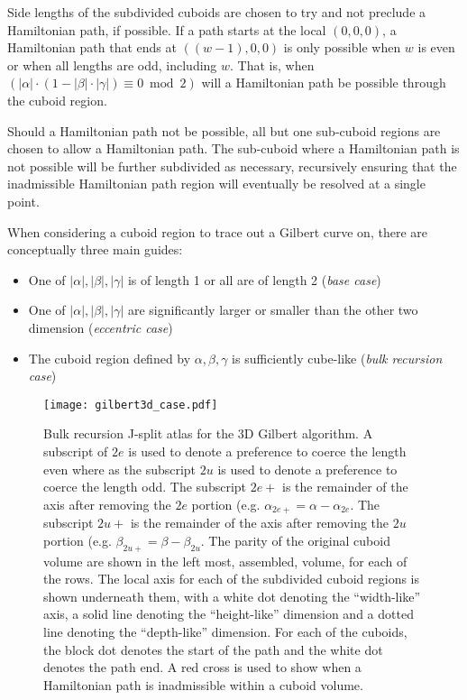 Side lengths of the subdivided cuboids are chosen to try and not preclude a
Hamiltonian path, if possible.
If a path starts at the local $(0,0,0)$, a Hamiltonian path that ends
at $((w-1),0,0)$ is only possible when $w$ is even or when all lengths are odd, including $w$.
That is, when $(|\alpha| \cdot ( 1 - |\beta| \cdot |\gamma| ) \equiv 0 \bmod 2)$ will a Hamiltonian
path be possible through the cuboid region.

Should a Hamiltonian path not be possible, all but one sub-cuboid regions are chosen to allow a Hamiltonian
path.
The sub-cuboid where a Hamiltonian path is not possible will be further subdivided as necessary, recursively
ensuring that the inadmissible Hamiltonian path region will eventually be resolved at a single point.

When considering a cuboid region to trace out a Gilbert curve on, there are conceptually three main guides:

\begin{itemize}
  \item One of $|\alpha|, |\beta|, |\gamma|$ is of length 1 or all are of length 2 (\textit{base case})
  \item One of $|\alpha|, |\beta|, |\gamma|$ are significantly larger or smaller than the other two dimension (\textit{eccentric case})
  \item The cuboid region defined by $\alpha, \beta, \gamma$ is sufficiently cube-like (\textit{bulk recursion case})
\end{itemize}


\begin{figure*}[ht]
  \centering
  \texttt{[image: gilbert3d\_case.pdf]}
  \caption{ Bulk recursion J-split atlas for the 3D Gilbert algorithm. A subscript of $2e$ is used to denote a preference
  to coerce the length even where as the subscript $2u$ is used to denote a preference to coerce the length odd.
  The subscript $2e+$ is the remainder of the axis after removing the $2e$ portion (e.g. $\alpha_{2e+} = \alpha - \alpha_{2e}$.
  The subscript $2u+$ is the remainder of the axis after removing the $2u$ portion (e.g. $\beta_{2u+} = \beta - \beta_{2u}$.
  The parity of the original cuboid volume are shown in the left most, assembled, volume, for each of the rows.
  The local axis for each of the subdivided cuboid regions is shown underneath them, with a white dot
  denoting the ``width-like'' axis, a solid line denoting the ``height-like'' dimension and a dotted line
  denoting the ``depth-like'' dimension. For each of the cuboids, the block dot denotes the start of the path
  and the white dot denotes the path end. A red cross is used to show when a Hamiltonian path is inadmissible within a cuboid volume.  }
  \label{fig:gilbert3DCase}
\end{figure*}


